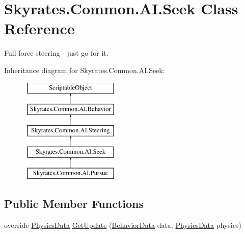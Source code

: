 \hypertarget{class_skyrates_1_1_common_1_1_a_i_1_1_seek}{\section{Skyrates.\-Common.\-A\-I.\-Seek Class Reference}
\label{class_skyrates_1_1_common_1_1_a_i_1_1_seek}
}


Full force steering -\/ just go for it.  


Inheritance diagram for Skyrates.\-Common.\-A\-I.\-Seek\-:\begin{figure}[H]
\begin{center}
\leavevmode
\includegraphics[height=5.000000cm]{class_skyrates_1_1_common_1_1_a_i_1_1_seek}
\end{center}
\end{figure}
\subsection*{Public Member Functions}
\begin{DoxyCompactItemize}
\item 
override \hyperlink{class_skyrates_1_1_common_1_1_a_i_1_1_physics_data}{Physics\-Data} \hyperlink{class_skyrates_1_1_common_1_1_a_i_1_1_seek_aed4d8c27e1d2fbd18a7616291be6c8b5}{Get\-Update} (\hyperlink{class_skyrates_1_1_common_1_1_a_i_1_1_behavior_data}{Behavior\-Data} data, \hyperlink{class_skyrates_1_1_common_1_1_a_i_1_1_physics_data}{Physics\-Data} physics)
\end{DoxyCompactItemize}

